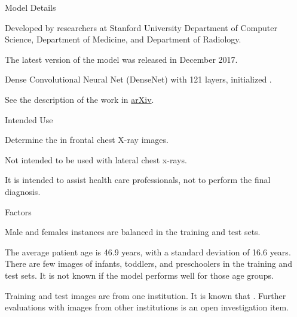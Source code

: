 \documentclass{article}
\begin{document}
\begin{adjustwidth}{-60pt}{-30pt}
\begin{singlespace}

\begin{tcolorbox}[title=\textbf{Model Card - CheXNet},
    breakable, sharp corners, boxrule=0.7pt]

\small{

\begin{mcsection}{Model Details}
    \item Developed by researchers at Stanford University Department of Computer Science, Department of Medicine, and Department of Radiology.
    \item The latest version of the model was released in December 2017.
    \item Dense Convolutional Neural Net (DenseNet) with 121 layers, initialized  \cite{Rajpurkar2017}.
    \item See the description of the work in \href{https://arxiv.org/abs/1711.05225}{arXiv}.
\end{mcsection}

\begin{mcsection}{Intended Use}
    \item Determine the  \cite{Rajpurkar2017}  \cite{OakdenRayner2018a} in frontal chest X-ray images.
    \item Not intended to be used with lateral chest x-rays.
    \item It is intended to assist health care professionals, not to perform the final diagnosis.
\end{mcsection}

\begin{mcsection}{Factors}
    \item Male and females instances are balanced in the training and test sets.
    \item The average patient age is 46.9 years, with a standard deviation of 16.6 years. There are few images of infants, toddlers, and preschoolers in the training and test sets. It is not known if the model performs well for those age groups.
    \item Training and test images are from one institution. It is known that  \cite{Zech2018} \cite{Pooch2019} \cite{Yao2019}. Further evaluations with images from other institutions is an open investigation item.
\end{mcsection}

}
\end{tcolorbox}
\end{singlespace}
\end{adjustwidth}
\end{document}
